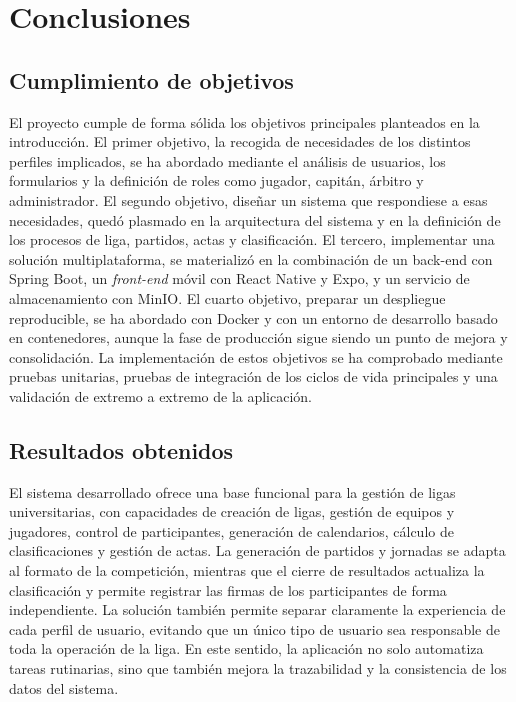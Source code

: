 
\chapter{Conclusiones}
\label{ch:conclusions}

\section{Cumplimiento de objetivos}

El proyecto cumple de forma sólida los objetivos principales planteados en la introducción. El primer objetivo, la recogida de necesidades de los distintos perfiles implicados, se ha abordado mediante el análisis de usuarios, los formularios y la definición de roles como jugador, capitán, árbitro y administrador. El segundo objetivo, diseñar un sistema que respondiese a esas necesidades, quedó plasmado en la arquitectura del sistema y en la definición de los procesos de liga, partidos, actas y clasificación. El tercero, implementar una solución multiplataforma, se materializó en la combinación de un back-end con Spring Boot, un \emph{front-end} móvil con React Native y Expo, y un servicio de almacenamiento con MinIO. El cuarto objetivo, preparar un despliegue reproducible, se ha abordado con Docker y con un entorno de desarrollo basado en contenedores, aunque la fase de producción sigue siendo un punto de mejora y consolidación. La implementación de estos objetivos se ha comprobado mediante pruebas unitarias, pruebas de integración de los ciclos de vida principales y una validación de extremo a extremo de la aplicación.

\section{Resultados obtenidos}

El sistema desarrollado ofrece una base funcional para la gestión de ligas universitarias, con capacidades de creación de ligas, gestión de equipos y jugadores, control de participantes, generación de calendarios, cálculo de clasificaciones y gestión de actas. La generación de partidos y jornadas se adapta al formato de la competición, mientras que el cierre de resultados actualiza la clasificación y permite registrar las firmas de los participantes de forma independiente. La solución también permite separar claramente la experiencia de cada perfil de usuario, evitando que un único tipo de usuario sea responsable de toda la operación de la liga. En este sentido, la aplicación no solo automatiza tareas rutinarias, sino que también mejora la trazabilidad y la consistencia de los datos del sistema.


